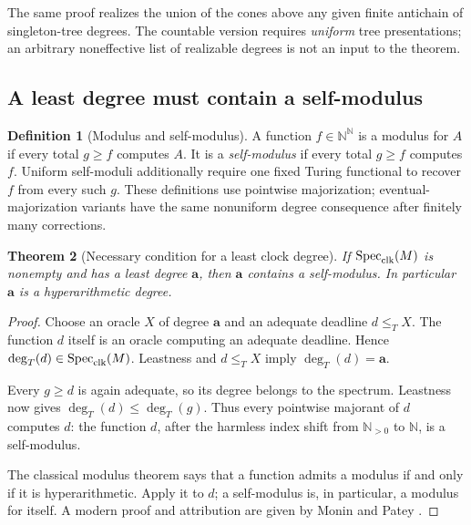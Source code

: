 \documentclass[11pt,letterpaper]{article}
\newtheorem{theorem}{Theorem}[section]
\theoremstyle{definition}
\newtheorem{definition}[theorem]{Definition}
\theoremstyle{remark}
\newcommand{\N}{\mathbb N}
\newcommand{\1}{\mathbf 1}
\newcommand{\csdegT}{\operatorname{deg}_{T}}
\newcommand{\csSpec}{\operatorname{Spec}_{\rm clk}}
\begin{document}
The same proof realizes the union of the cones above any given finite
antichain of singleton-tree degrees. The countable version requires
\emph{uniform} tree presentations; an arbitrary noneffective list of
realizable degrees is not an input to the theorem.

\subsection{A least degree must contain a self-modulus}

\begin{definition}[Modulus and self-modulus]
A function $f\in\N^\N$ is a modulus for $A$ if every total $g\geq f$
computes $A$. It is a \emph{self-modulus} if every total $g\geq f$ computes
$f$. Uniform self-moduli additionally require one fixed Turing functional
to recover $f$ from every such $g$. These definitions use pointwise
majorization; eventual-majorization variants have the same nonuniform
degree consequence after finitely many corrections.
\end{definition}

\begin{theorem}[Necessary condition for a least clock degree]\label{lbh:cs:thm:least}
If $\csSpec(M)$ is nonempty and has a least degree $\mathbf a$, then
$\mathbf a$ contains a self-modulus. In particular $\mathbf a$ is a
hyperarithmetic degree.
\end{theorem}

\begin{proof}
Choose an oracle $X$ of degree $\mathbf a$ and an adequate deadline
$d\leq_T X$. The function $d$ itself is an oracle computing an adequate
deadline. Hence $\csdegT(d)\in\csSpec(M)$. Leastness and $d\leq_T X$ imply
$\csdegT(d)=\mathbf a$.

Every $g\geq d$ is again adequate, so its degree belongs to the spectrum.
Leastness now gives $\csdegT(d)\leq\csdegT(g)$. Thus every pointwise majorant
of $d$ computes $d$: the function $d$, after the harmless index shift from
$\N_{>0}$ to $\N$, is a self-modulus.

The classical modulus theorem says that a function admits a modulus if
and only if it is hyperarithmetic. Apply it to $d$; a self-modulus is, in
particular, a modulus for itself. A modern proof and attribution are given
by Monin and Patey \cite[Corollary~2.2]{cs-monin-patey}.
\end{proof}
\end{document}
